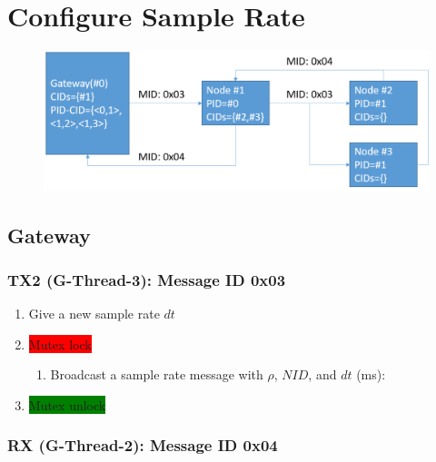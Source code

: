 \documentclass[letterpaper,10pt]{article}
\begin{document}
\newpage
\section{Configure Sample Rate}

\begin{figure}[!h]
	\centering
	\includegraphics[width=12cm]{./img/samplerate.png}
\end{figure}

\subsection{Gateway}

\subsubsection{TX2 (G-Thread-3): Message ID 0x03}

\begin{enumerate}
	\item Give a new sample rate $dt$
	\item \colorbox{red}{Mutex lock}
	\begin{enumerate}
		\item Broadcast a sample rate message with $\rho$, $NID$, and $dt$ (ms):\\
	\end{enumerate}
	\item \colorbox{green}{Mutex unlock}
\end{enumerate}

\subsubsection{RX (G-Thread-2): Message ID 0x04}
\end{document}
